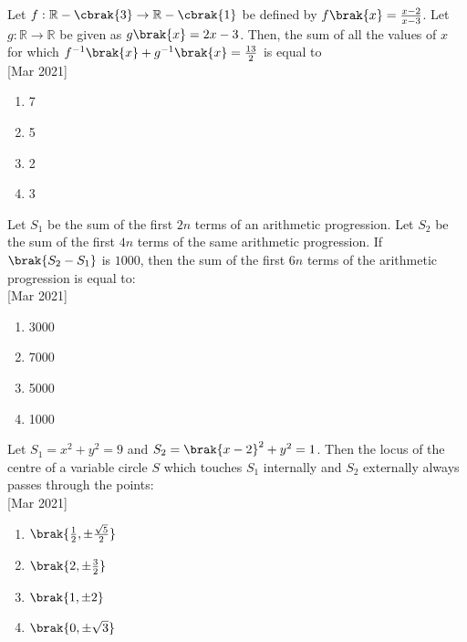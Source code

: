  	\item{
        	Let $f: \mathbb{R} - \cbrak{3} \rightarrow \mathbb{R} - \cbrak{1}$ be defined by $f\brak{x} = \frac{x - 2}{x - 3}$. Let $g: \mathbb{R} \rightarrow \mathbb{R}$ be given as $g\brak{x} = 2x - 3$. Then, the sum of all the values of $x$ for which $f^{-1}\brak{x}+ g^{-1}\brak{x} = \frac{13}{2}$ is equal to\\ \text{ }
        	\hfill
        	{[Mar 2021]}
        	
        	\begin{multicols}{4}
        		\begin{enumerate}
					\item 7
					
					\item 5
					
					\item 2
					
					\item 3
        		\end{enumerate}
        	\end{multicols}
        	
        }
 	\item{
			Let $S_1$ be the sum of the first $2n$ terms of an arithmetic progression. Let $S_2$ be the sum of the first $4n$ terms of the same arithmetic progression. If $\brak{S_2 - S_1}$ is $1000$, then the sum of the first $6n$ terms of the arithmetic progression is equal to:\\ \text{ }
			\hfill
			{[Mar 2021]}
			
			\begin{multicols}{4}
				\begin{enumerate}
					\item 3000
					\item 7000
					\item 5000
					\item 1000
				\end{enumerate}
			\end{multicols}
			
		}
 	\item{
			Let $S_1 = x^2 + y^2 = 9$ and $S_2 = \brak{x - 2}^2 + y^2 = 1$. Then the locus of the centre of a variable circle $S$ which touches $S_1$ internally and $S_2$ externally always passes through the points:\\ \text{ }
			\hfill
			{[Mar 2021]}
			
			\begin{multicols}{4}
				\begin{enumerate}
					\item $\brak{ \frac{1}{2}, \pm \frac{\sqrt{5}}{2}}$
					\item $\brak{ 2, \pm \frac{3}{2}}$
					\item $\brak{ 1, \pm 2 }$
					\item $\brak{ 0, \pm \sqrt{3}}$
				\end{enumerate}
			\end{multicols}
			
		}
